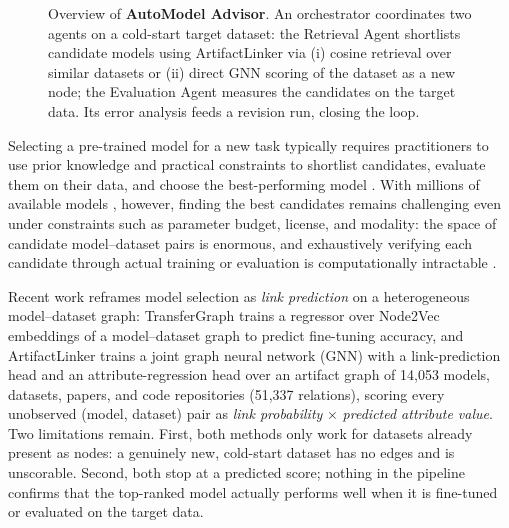 \begin{figure}[t]
  \centering
  \resizebox{\textwidth}{!}{}
  \caption{Overview of \textbf{AutoModel Advisor}. An orchestrator coordinates two agents on a cold-start target dataset: the Retrieval Agent shortlists candidate models using ArtifactLinker via (i) cosine retrieval over similar datasets or (ii) direct GNN scoring of the dataset as a new node; the Evaluation Agent measures the candidates on the target data. Its error analysis feeds a revision run, closing the loop.}
  \label{fig:pipeline}
\end{figure}

Selecting a pre-trained model for a new task typically requires practitioners to use prior knowledge and practical constraints to shortlist candidates, evaluate them on their data, and choose the best-performing model \citep{you2021logme,zhang2023modelspider,li2024transfergraph}. With millions of available models \citep{laufer2025anatomy,castano2023evolution,ait2023suitability}, however, finding the best candidates remains challenging even under constraints such as parameter budget, license, and modality: the space of candidate model--dataset pairs is enormous, and exhaustively verifying each candidate through actual training or evaluation is computationally intractable \citep{urbanowicz2022streamline,yu2026artifactlinker}.

Recent work reframes model selection as \emph{link prediction} on a heterogeneous model--dataset graph: TransferGraph \citep{li2024transfergraph} trains a regressor over Node2Vec embeddings of a model--dataset graph to predict fine-tuning accuracy, and ArtifactLinker \citep{yu2026artifactlinker} trains a joint graph neural network (GNN) with a link-prediction head and an attribute-regression head over an artifact graph of 14{,}053 models, datasets, papers, and code repositories (51{,}337 relations), scoring every unobserved (model, dataset) pair as \emph{link probability} $\times$ \emph{predicted attribute value}. Two limitations remain. First, both methods only work for datasets already present as nodes: a genuinely new, cold-start dataset has no edges and is unscorable. Second, both stop at a predicted score; nothing in the pipeline confirms that the top-ranked model actually performs well when it is fine-tuned or evaluated on the target data.

